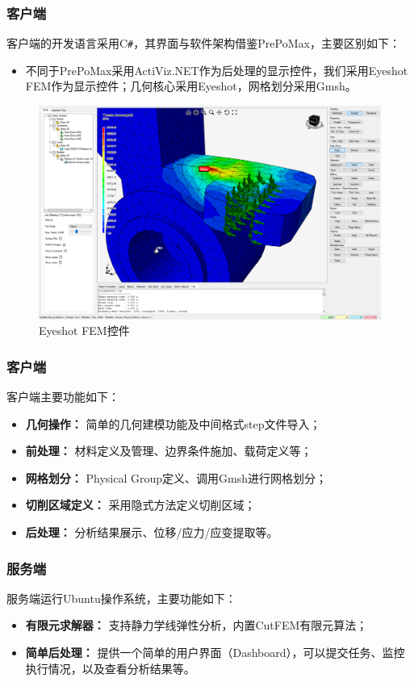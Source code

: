 \documentclass[lang=en,aspectratio=43,theme=default,logo=on]{simplebeamer}
\begin{document}
\begin{frame}[fragile]
    \frametitle{客户端}
客户端的开发语言采用C\verb|#|，其界面与软件架构借鉴PrePoMax，主要区别如下：
\begin{itemize}
    \item 不同于PrePoMax采用ActiViz.NET作为后处理的显示控件，我们采用Eyeshot FEM作为显示控件；几何核心采用Eyeshot，网格划分采用Gmsh。
\end{itemize}
 \begin{figure}
    \centering %
    \includegraphics[height=0.5\textheight]{./img/fem.png}
    \caption{Eyeshot FEM控件}
\end{figure}
\end{frame}

\begin{frame}[fragile]
    \frametitle{客户端}
    客户端主要功能如下：
    \begin{itemize}
        \item \textbf{几何操作：} 简单的几何建模功能及中间格式step文件导入；
        \item \textbf{前处理：} 材料定义及管理、边界条件施加、载荷定义等；
        \item \textbf{网格划分：} Physical Group定义、调用Gmsh进行网格划分；
        \item \textbf{切削区域定义：} 采用隐式方法定义切削区域；
        \item \textbf{后处理：} 分析结果展示、位移/应力/应变提取等。
    \end{itemize}
\end{frame}

\begin{frame}[fragile]
    \frametitle{服务端}
    服务端运行Ubuntu操作系统，主要功能如下：
    \begin{itemize}
        \item \textbf{有限元求解器：} 支持静力学线弹性分析，内置CutFEM有限元算法；
        \item \textbf{简单后处理：} 提供一个简单的用户界面（Dashboard），可以提交任务、监控执行情况，以及查看分析结果等。
    \end{itemize}
\end{frame}
\end{document}
